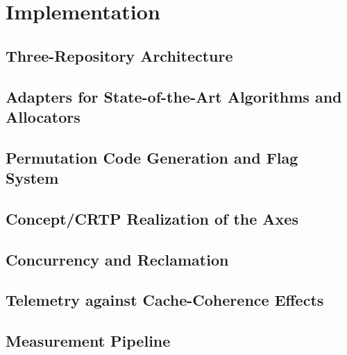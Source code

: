 \chapter{Implementation}\label{ch:impl}


\section{Three-Repository Architecture}\label{sec:repos}

\section{Adapters for State-of-the-Art Algorithms and Allocators}\label{sec:adapters}

\section{Permutation Code Generation and Flag System}\label{sec:codegen}

\section{Concept/CRTP Realization of the Axes}\label{sec:concept-crtp}

\section{Concurrency and Reclamation}\label{sec:concurrency}

\section{Telemetry against Cache-Coherence Effects}\label{sec:telemetry}

\section{Measurement Pipeline}\label{sec:pipeline}
